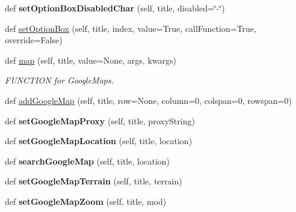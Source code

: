 \begin{DoxyCompactItemize}
\item 
\mbox{\label{class_python_01_g_u_i_1_1appjar_1_1gui_aefe8a05c50704a51a71ac38005c5b7ae}} 
def {\bfseries set\+Option\+Box\+Disabled\+Char} (self, title, disabled=\char`\"{}-\/\char`\"{})
\item 
def \hyperlink{class_python_01_g_u_i_1_1appjar_1_1gui_a3de52310d141739c74dfe53e032cc55c}{set\+Option\+Box} (self, title, index, value=True, call\+Function=True, override=False)
\item 
def \hyperlink{class_python_01_g_u_i_1_1appjar_1_1gui_ae1ab2247d06958d044ab81677644d57e}{map} (self, title, value=None, args, kwargs)
\begin{DoxyCompactList}\small\item\em F\+U\+N\+C\+T\+I\+ON for Google\+Maps. \end{DoxyCompactList}\item 
def \hyperlink{class_python_01_g_u_i_1_1appjar_1_1gui_aa1e4b75d2692f52d11e1c9e28ccf4e27}{add\+Google\+Map} (self, title, row=None, column=0, colspan=0, rowspan=0)
\item 
\mbox{\label{class_python_01_g_u_i_1_1appjar_1_1gui_a50327e5ee25900b8b636fc9d0a782b7c}} 
def {\bfseries set\+Google\+Map\+Proxy} (self, title, proxy\+String)
\item 
\mbox{\label{class_python_01_g_u_i_1_1appjar_1_1gui_a872dc5bc5ea55d558b2dc62cc217a428}} 
def {\bfseries set\+Google\+Map\+Location} (self, title, location)
\item 
\mbox{\label{class_python_01_g_u_i_1_1appjar_1_1gui_a9c80b4f2912e43f0548f7f18da6ae7f1}} 
def {\bfseries search\+Google\+Map} (self, title, location)
\item 
\mbox{\label{class_python_01_g_u_i_1_1appjar_1_1gui_a4461a4a6403d24ce150a8409d31a0745}} 
def {\bfseries set\+Google\+Map\+Terrain} (self, title, terrain)
\item 
\mbox{\label{class_python_01_g_u_i_1_1appjar_1_1gui_a7184a8f81f95f4bb7d9ec74b904c3e51}} 
def {\bfseries set\+Google\+Map\+Zoom} (self, title, mod)
\item 

\end{DoxyCompactItemize}
